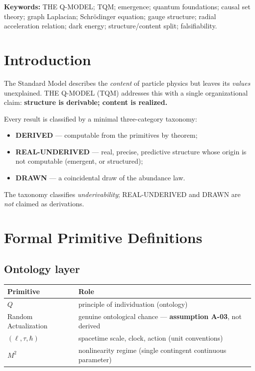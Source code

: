 \documentclass[11pt,a4paper]{article}
\begin{document}
\noindent\textbf{Keywords:} THE Q-MODEL; TQM; emergence; quantum foundations; causal set
theory; graph Laplacian; Schr\"odinger equation; gauge structure; radial acceleration
relation; dark energy; structure/content split; falsifiability.

\tableofcontents

\section{Introduction}
\label{sec:intro}

The Standard Model describes the \emph{content} of particle physics but leaves its
\emph{values} unexplained. THE Q-MODEL (TQM) addresses this with a single organizational
claim: \textbf{structure is derivable; content is realized.}

Every result is classified by a minimal three-category taxonomy:
\begin{itemize}
\item \textbf{DERIVED} — computable from the primitives by theorem;
\item \textbf{REAL-UNDERIVED} — real, precise, predictive structure whose origin is not
      computable (emergent, or structured);
\item \textbf{DRAWN} — a coincidental draw of the abundance law.
\end{itemize}
The taxonomy classifies \emph{underivability}; REAL-UNDERIVED and DRAWN are \emph{not}
claimed as derivations.

\section{Formal Primitive Definitions}
\label{sec:primitives}

\subsection{Ontology layer}
\begin{center}
\begin{tabular}{ll}
\toprule
Primitive & Role \\
\midrule
$Q$ & principle of individuation (ontology) \\
Random Actualization & genuine ontological chance — \textbf{assumption A-03}, not derived \\
$(\ell,\tau,\hbar)$ & spacetime scale, clock, action (unit conventions) \\
$M^2$ & nonlinearity regime (single contingent continuous parameter) \\
\bottomrule
\end{tabular}
\end{center}
\end{document}
